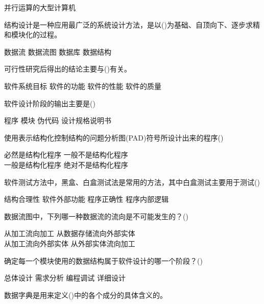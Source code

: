 \documentclass[answers]{exam}
\begin{document}
\begin{questions}
\begin{oneparchoices}
		\choice 并行运算的大型计算机
	\end{oneparchoices}
	\question 结构设计是一种应用最广泛的系统设计方法，是以()为基础、自顶向下、逐步求精和模块化的过程。\\
	\begin{oneparchoices}
		\choice 数据流
		\correctchoice 数据流图
		\choice 数据库
		\choice 数据结构
	\end{oneparchoices}
	\question 可行性研究后得出的结论主要与()有关。\\
	\begin{oneparchoices}
		\correctchoice 软件系统目标
		\choice 软件的功能
		\choice 软件的性能
		\choice 软件的质量
	\end{oneparchoices}
	\question 软件设计阶段的输出主要是()\\
	\begin{oneparchoices}
		\choice 程序
		\choice 模块
		\choice 伪代码
		\correctchoice 设计规格说明书
	\end{oneparchoices}
	\question 使用表示结构化控制结构的问题分析图(PAD)符号所设计出来的程序()\\
	\begin{oneparchoices}
		\correctchoice 必然是结构化程序
		\choice 一般不是结构化程序\\
		\choice 一般是结构化程序
		\choice 绝对不是结构化程序
	\end{oneparchoices}
	\question 软件测试方法中，黑盒、白盒测试法是常用的方法，其中白盒测试主要用于测试()\\
	\begin{oneparchoices}
		\choice 结构合理性
		\choice 软件外部功能
		\choice 程序正确性
		\correctchoice 程序内部逻辑
	\end{oneparchoices}
	\question 数据流图中，下列哪一种数据流的流向是不可能发生的？()\\
	\begin{oneparchoices}
		\choice 从加工流向加工
		\correctchoice 从数据存储流向外部实体\\
		\choice 从加工流向外部实体
		\choice 从外部实体流向加工
	\end{oneparchoices}
	\question 确定每一个模块使用的数据结构属于软件设计的哪一个阶段？()\\
	\begin{oneparchoices}
		\choice 总体设计
		\choice 需求分析
		\choice 编程调试
		\correctchoice 详细设计
	\end{oneparchoices}
	\question 数据字典是用来定义()中的各个成分的具体含义的。\\
	\begin{oneparchoices}

\end{oneparchoices}
\end{questions}
\end{document}
